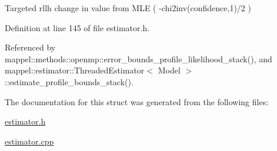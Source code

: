 Targeted rllh change in value from M\+LE ( -\/chi2inv(confidence,1)/2 ) 



Definition at line 145 of file estimator.\+h.



Referenced by mappel\+::methods\+::openmp\+::error\+\_\+bounds\+\_\+profile\+\_\+likelihood\+\_\+stack(), and mappel\+::estimator\+::\+Threaded\+Estimator$<$ Model $>$\+::estimate\+\_\+profile\+\_\+bounds\+\_\+stack().



The documentation for this struct was generated from the following files\+:\begin{DoxyCompactItemize}
\item 
\hyperlink{estimator_8h}{estimator.\+h}\item 
\hyperlink{estimator_8cpp}{estimator.\+cpp}\end{DoxyCompactItemize}
